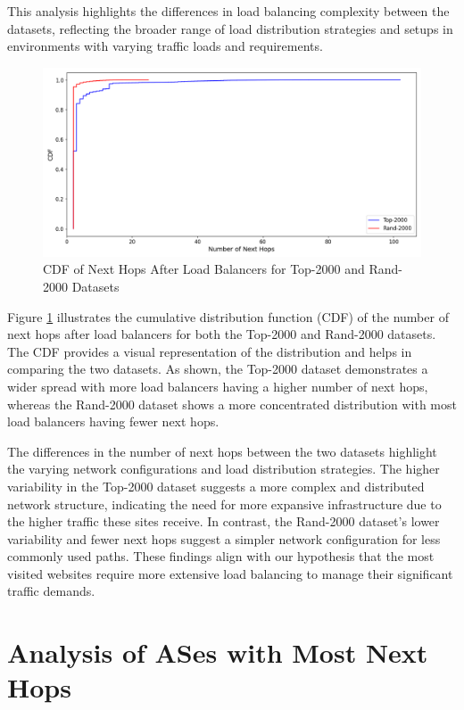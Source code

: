 \documentclass[12pt]{cwru_thesis}
\begin{document}
This analysis highlights the differences in load balancing complexity between the datasets, reflecting the broader range of load distribution strategies and setups in environments with varying traffic loads and requirements.

\begin{figure}[h]
    \centering
    \includegraphics[width=\linewidth]{figures/cdf_next_hops.png}
    \caption{CDF of Next Hops After Load Balancers for Top-2000 and Rand-2000 Datasets}
    \label{fig:cdf_next_hops}
\end{figure}

Figure \ref{fig:cdf_next_hops} illustrates the cumulative distribution function (CDF) of the number of next hops after load balancers for both the Top-2000 and Rand-2000 datasets. The CDF provides a visual representation of the distribution and helps in comparing the two datasets. As shown, the Top-2000 dataset demonstrates a wider spread with more load balancers having a higher number of next hops, whereas the Rand-2000 dataset shows a more concentrated distribution with most load balancers having fewer next hops.



The differences in the number of next hops between the two datasets highlight the varying network configurations and load distribution strategies. The higher variability in the Top-2000 dataset suggests a more complex and distributed network structure, indicating the need for more expansive infrastructure due to the higher traffic these sites receive. In contrast, the Rand-2000 dataset's lower variability and fewer next hops suggest a simpler network configuration for less commonly used paths. These findings align with our hypothesis that the most visited websites require more extensive load balancing to manage their significant traffic demands.
\newpage
\section{Analysis of ASes with Most Next Hops}
\end{document}
